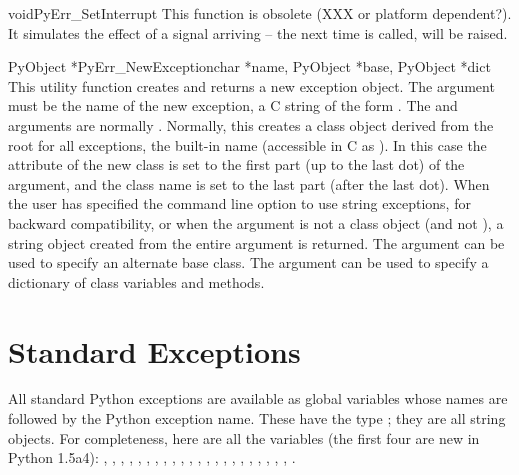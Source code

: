 \documentclass[twoside]{report}
\begin{document}
\begin{cfuncdesc}{void}{PyErr_SetInterrupt}{}
This function is obsolete (XXX or platform dependent?).  It simulates
the effect of a  signal arriving -- the next time
 is called,  will be
raised.
\end{cfuncdesc}

\begin{cfuncdesc}{PyObject *}{PyErr_NewException}{char *name,
PyObject *base, PyObject *dict}
This utility function creates and returns a new exception object.  The
 argument must be the name of the new exception, a C string
of the form .  The  and 
arguments are normally \NULL{}.  Normally, this creates a class
object derived from the root for all exceptions, the built-in name
 (accessible in C as ).  In this
case the  attribute of the new class is set to the
first part (up to the last dot) of the  argument, and the
class name is set to the last part (after the last dot).  When the
user has specified the  command line option to use string
exceptions, for backward compatibility, or when the 
argument is not a class object (and not \NULL{}), a string object
created from the entire  argument is returned.  The
 argument can be used to specify an alternate base class.
The  argument can be used to specify a dictionary of class
variables and methods.
\end{cfuncdesc}


\section{Standard Exceptions}

All standard Python exceptions are available as global variables whose
names are  followed by the Python exception name.
These have the type ; they are all string objects.
For completeness, here are all the variables (the first four are new
in Python 1.5a4):
,
,
,
,
,
,
,
,
,
,
,
,
,
,
,
,
,
,
,
,
,
,
.
\end{document}
